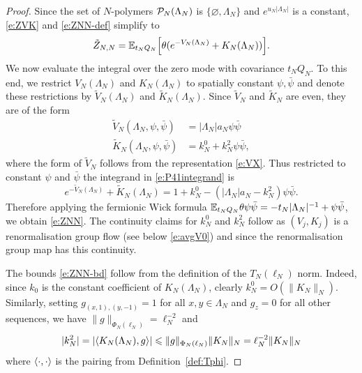 \documentclass[11pt]{amsart}
\numberwithin{equation}{section}
\numberwithin{theorem}{section}
\newcommand{\1}{{\bf 1}}
\begin{document}
\begin{proof}
  Since the set of $N$-polymers $\mathcal P_N(\Lambda_N)$ is $\{\varnothing,
  \Lambda_{N}\}$ and $e^{u_{N}|\Lambda_N|}$ is a constant,  
  \eqref{e:ZVK} and \eqref{e:ZNN-def} simplify to
  \begin{equation}
    \label{e:P41integrand}
    \tilde Z_{N,N} = \mathbb{E}_{t_NQ_N}\Bigl[{\theta(e^{-V_N(\Lambda_{N})}+K_N(\Lambda_{N}))}\Bigr].
  \end{equation}
  We now evaluate the integral over the zero mode with covariance
  $t_NQ_N$.  To this end, we restrict $V_N(\Lambda_{N})$ and
  $K_N(\Lambda_{N})$ to spatially constant $\psi,\bar\psi$ and denote
  these restrictions by $\widetilde{V}_{N} (\Lambda_{N})$ and
  $\widetilde{K}_{N}(\Lambda_{N})$.  Since
  $\widetilde{V}_{N}$ and $\widetilde{K}_{N}$ are
  even, they are of the form
  \begin{align}
    \widetilde{V}_{N} (\Lambda_{N},\psi,\bar\psi) &= |\Lambda_{N}|a_N \psi\bar\psi
    \\
    \widetilde{K}_{N} (\Lambda_{N},\psi,\bar\psi) &= k_{N}^{0} + k_N^{2} \psi\bar\psi,
  \end{align}
  where the form of $\widetilde{V}_{N}$ follows from the representation \eqref{e:VX}.
  Thus restricted to constant $\psi$ and $\bar\psi$ the integrand in \eqref{e:P41integrand} is
  \begin{equation}
    e^{- {\widetilde{V}_{N}} (\Lambda_{N})} + \widetilde{K}_{N} (\Lambda_{N})
    = 1 +  k_N^0  - (|\Lambda_{N}|a_N - k_N^2)\psi\bar\psi
    .
  \end{equation}
  Therefore applying the fermionic Wick formula
  $\mathbb{E}_{t_NQ_N}\theta \psi\bar\psi = -t_N|\Lambda_{N}|^{-1}
  +\psi\bar\psi$, we obtain \eqref{e:ZNN}.  The continuity claims for
  $k_{N}^{0}$ and $k_{N}^{2}$ follow as 
  $(V_j,K_j)$ is a renormalisation group flow (see below
  \eqref{e:avgV0}) and since the
  renormalisation group map has this   continuity. 

  The bounds \eqref{e:ZNN-bd} follow from the definition of the
  $T_N(\ell_N)$ norm.  Indeed, since $k_0$ is the constant coefficient of
  $K_N(\Lambda_{N})$, clearly $k_N^0=O(\|K_N\|_N)$.  Similarly, setting
  $g_{(x,1),(y,-1)} = 1$ for all $x,y\in\Lambda_{N}$ and $g_z=0$ for all
  other sequences, we have $\|g\|_{\Phi_N(\ell_N)} = \ell_N^{-2}$ and
  \begin{equation} \label{e:kN2normbd}
    |k_N^2| = |\langle K_N(\Lambda_{N}),g \rangle|
    \leqslant \|g\|_{\Phi_N(\ell_N)}\|K_N\|_N
    =
    \ell_N^{-2}\|K_N\|_N
  \end{equation}
  where $\langle \cdot,\cdot \rangle$ is the pairing from Definition~\ref{def:Tphi}.
\end{proof}
\end{document}
